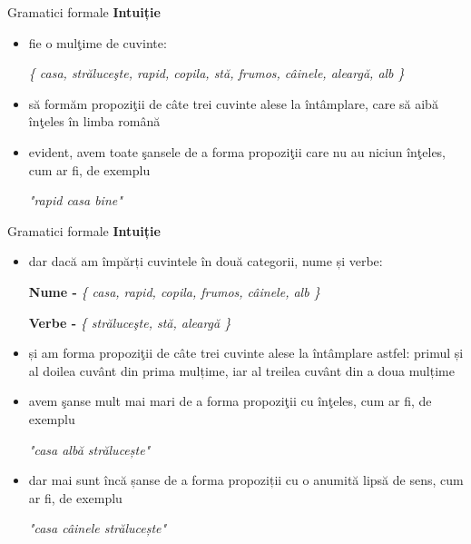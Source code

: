 \documentclass[pdf]{beamer}
\begin{document}
\begin{frame}{Gramatici formale}
\textbf{Intuiție}
\begin{itemize}
\item
fie o mulţime de cuvinte:

\textit{ \{ casa, străluceşte, rapid, copila, stă, frumos, câinele, aleargă, alb \} }
\item
să formăm propoziţii de câte trei cuvinte alese la întâmplare, care să aibă înţeles în limba română
\item
evident, avem toate şansele de a forma propoziţii care nu au niciun înţeles, cum ar fi, de exemplu

\textit{ "rapid casa bine" }
\end{itemize}
\end{frame}



\begin{frame}{Gramatici formale}
\textbf{Intuiție}
\begin{itemize}
\item
dar dacă am împărți cuvintele în două categorii, nume și verbe:

\textbf{Nume - }\textit{ \{ casa, rapid, copila, frumos, câinele, alb \} }

\textbf{Verbe - }\textit{ \{ străluceşte, stă, aleargă \} }

\item
și am forma propoziţii de câte trei cuvinte alese la întâmplare astfel: primul și al doilea cuvânt din prima mulțime, iar al treilea cuvânt din a doua mulțime
\item
avem şanse mult mai mari de a forma propoziţii cu înţeles, cum ar fi, de exemplu

\textit{ "casa albă strălucește" }
\item
dar mai sunt încă șanse de a forma propoziții cu o anumită lipsă de sens, cum ar fi, de exemplu

\textit{ "casa câinele strălucește" }
\end{itemize}
\end{frame}
\end{document}
